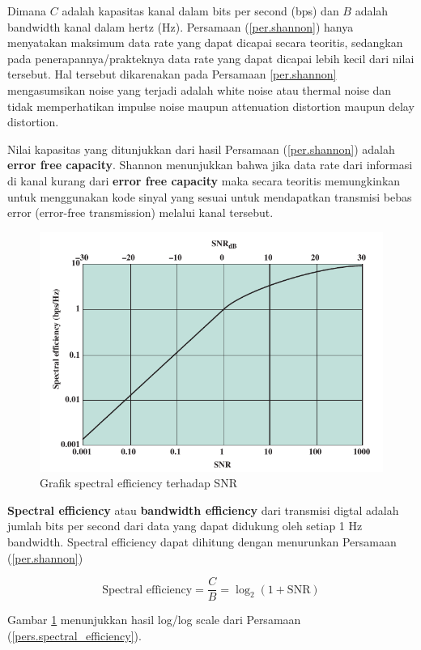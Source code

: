 Dimana $ C $ adalah kapasitas kanal dalam bits per second (bps) dan $ B $ adalah bandwidth kanal dalam hertz (Hz). Persamaan (\ref{per.shannon}) hanya menyatakan maksimum data rate yang dapat dicapai secara teoritis, sedangkan pada penerapannya/prakteknya data rate yang dapat dicapai lebih kecil dari nilai tersebut. Hal tersebut dikarenakan pada Persamaan \ref{per.shannon} mengasumsikan noise yang terjadi adalah white noise atau thermal noise dan tidak memperhatikan impulse noise maupun attenuation distortion maupun delay distortion.

Nilai kapasitas yang ditunjukkan dari hasil Persamaan (\ref{per.shannon}) adalah \textbf{error free capacity}. Shannon menunjukkan bahwa jika data rate dari informasi di kanal kurang dari \textbf{error free capacity} maka secara teoritis memungkinkan untuk menggunakan kode sinyal yang sesuai untuk mendapatkan transmisi bebas error (error-free transmission) melalui kanal tersebut.

\begin{figure}
	\centering
	\includegraphics[width=\linewidth]{gambar/3.4.gambar.3.16.spectral_efficiency_vs_snr}
	\caption{Grafik spectral efficiency terhadap SNR}
	\label{fig.spectral_effy_vs_snr}
\end{figure}

\textbf{Spectral efficiency} atau \textbf{bandwidth efficiency} dari transmisi digtal adalah jumlah bits per second dari data yang dapat didukung oleh setiap 1 Hz bandwidth. Spectral efficiency dapat dihitung dengan menurunkan Persamaan (\ref{per.shannon})

\begin{equation} \label{pers.spectral_efficiency}
	\text{Spectral efficiency} = \frac{C}{B} = \log_2(1+\text{SNR})
\end{equation}

Gambar \ref{fig.spectral_effy_vs_snr} menunjukkan hasil log/log scale dari Persamaan (\ref{pers.spectral_efficiency}).